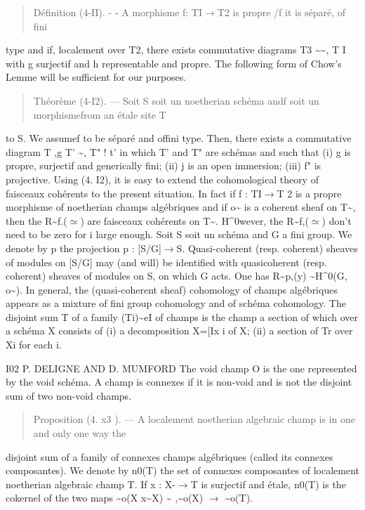 \documentclass[11pt]{article}
\theoremstyle{plain}
\theoremstyle{definition}
\theoremstyle{remark}
\begin{document}
\begin{quote}D\'efinition (4-II). - - A morphisme f: TI$\to$T2 is propre /f it is s\'epar\'e, of fini\end{quote}
type and if, localement over T2, there exists commutative diagrams T3 \textasciitilde{}\textasciitilde{}, T I with g surjectif and h representable and propre. The following form of Chow's Lemme will be sufficient for our purposes.

\begin{quote}Th\'eor\`eme (4-I2). --- Soit S soit un noetherian sch\'ema andf soit un morphismefrom an \'etale site T\end{quote}
to S. We assumef to be s\'epar\'e and offini type. Then, there exists a commutative diagram T ,g T' \textasciitilde{}, T" ! t' in which T' and T" are sch\'emas and such that (i) g is propre, surjectif and generically fini; (ii) j is an open immersion; (iii) f" is projective. Using (4. I2), it is easy to extend the cohomological theory of faisceaux coh\'erents to the present situation. In fact if f : TI$\to$T 2 is a propre morphisme of noetherian champs alg\'ebriques and if o\textasciitilde{} is a coherent sheaf on T\textasciitilde{}, then the R\textasciitilde{}f.($\simeq$) are faisceaux coh\'erents on T\textasciitilde{}. H\textasciicircum{}0wever, the R\textasciitilde{}f,($\simeq$) don't need to be zero for i large enough. Soit S soit un sch\'ema and G a fini group. We denote by p the projection p : [S/G]$\to$S. Quasi-coherent (resp. coherent) sheaves of modules on [S/G] may (and will) be identified with quasicoherent (resp. coherent) sheaves of modules on S, on which G acts. One has R\textasciitilde{}p,(y) \textasciitilde{}H\textasciicircum{}0(G, o\textasciitilde{}). In general, the (quasi-coherent sheaf) cohomology of champs alg\'ebriques appears as a mixture of fini group cohomology and of sch\'ema cohomology. The disjoint sum T of a family (Ti)\textasciitilde{}eI of champs is the champ a section of which over a sch\'ema X consists of (i) a decomposition X=[Ix i of X; (ii) a section of Tr over Xi for each i.

I02 P. DELIGNE AND D. MUMFORD The void champ O is the one represented by the void sch\'ema. A champ is connexes if it is non-void and is not the disjoint sum of two non-void champs.

\begin{quote}Proposition (4. x3 ). --- A localement noetherian algebraic champ is in one and only one way the\end{quote}
disjoint sum of a family of connexes champs alg\'ebriques (called its connexes composantes). We denote by n0(T) the set of connexes composantes of localement noetherian algebraic champ T. If x : X-$\to$T is surjectif and \'etale, n0(T) is the cokernel of the two maps \textasciitilde{}o(X x\textasciitilde{}X) \textasciitilde{} ,\textasciitilde{}o(X) $\to$ \textasciitilde{}o(T).
\end{document}

